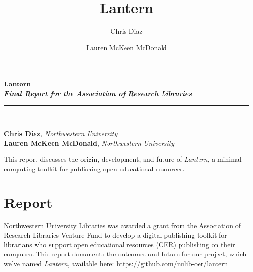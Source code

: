 \documentclass{book}
\title{Lantern}
\author{Chris Diaz \and Lauren McKeen McDonald}
\begin{document}
\frontmatter

\begin{titlepage}
\begin{flushleft}

\textbf{\fontsize{48}{54}\selectfont Lantern \\}
\textbf{\large \textit{Final Report for the Association of Research
Libraries}}

\par\noindent\rule{\textwidth}{4pt}\\

\begin{flushright}

      \textbf{Chris Diaz}, \emph{Northwestern University}\\
      \textbf{Lauren McKeen McDonald}, \emph{Northwestern University}\\
  
\end{flushright}

\vspace{\fill}

\end{flushleft}
  
\end{titlepage}
\restoregeometry


\addtocounter{page}{2}

This report discusses the origin, development, and future of \emph{Lantern}, a
minimal computing toolkit for publishing open educational resources.

\setcounter{tocdepth}{3}
\tableofcontents

\mainmatter

\hypertarget{report}{%
\chapter{Report}\label{report}}

Northwestern University Libraries was awarded a grant from
\href{https://www.arl.org/news/arl-launches-venture-fund-to-support-research-and-development-in-member-libraries-proposals-due-february-28/}{the
Association of Research Libraries Venture Fund} to develop a digital
publishing toolkit for librarians who support open educational resources (OER)
publishing on their campuses. This report documents the outcomes and future
for our project, which we've named \emph{Lantern}, available here:
\url{https://github.com/nulib-oer/lantern}
\end{document}
